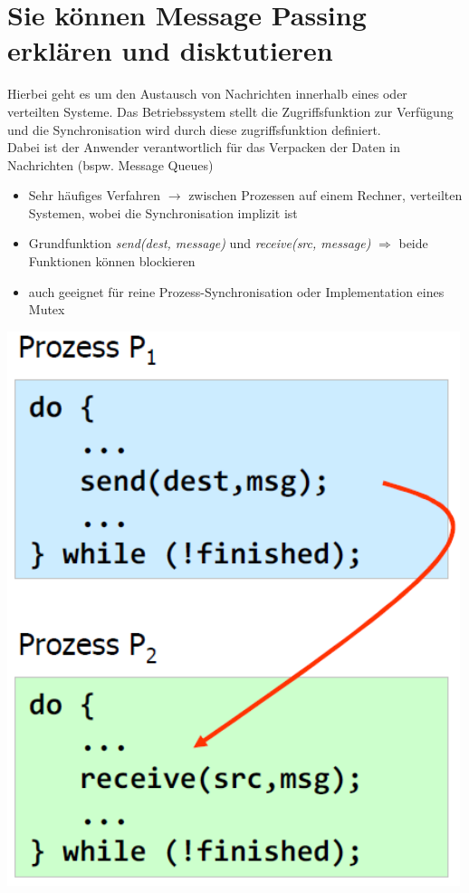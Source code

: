 \documentclass{report}
\newenvironment{Figure}
	{\par\medskip\noindent\minipage{\linewidth}}
	{\endminipage\par\medskip}
\theoremstyle{definition}
\theoremstyle{example}
\begin{document}
\section{Sie können Message Passing erklären und disktutieren}
Hierbei geht es um den Austausch von Nachrichten innerhalb eines oder verteilten Systeme. Das Betriebssystem stellt die Zugriffsfunktion zur Verfügung und die Synchronisation wird durch diese zugriffsfunktion definiert.\\
Dabei ist der Anwender verantwortlich für das Verpacken der Daten in Nachrichten (bspw. Message Queues)
\begin{itemize}
	\item Sehr häufiges Verfahren $\rightarrow$ zwischen Prozessen auf einem Rechner, verteilten Systemen, wobei die Synchronisation implizit ist
	\item Grundfunktion \textit{send(dest, message)} und \textit{receive(src, message)} $\Rightarrow$ beide Funktionen können blockieren
	\item auch geeignet für reine Prozess-Synchronisation oder Implementation eines Mutex
\end{itemize}

\begin{Figure}
\centering
\includegraphics[width=500px]{img/MessagePassing.png}
	\label{fig:Beispiel eines Message Passing}
\end{Figure}
\end{document}
